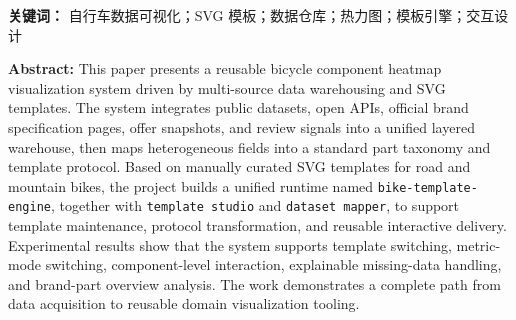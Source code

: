 \documentclass[12pt,hyperref,a4paper,UTF8]{ctexart}
\begin{document}
\cover

\begin{abstract}
针对自行车整车及配件数据来源分散、字段异构、部件语义不统一以及传统统计图难以表达结构差异的问题，本文设计并实现了一套基于可复用 SVG 模板与多源数据仓库的自行车配件热力图可视化系统。系统围绕“数据获取、统一建库、语义归一、模板设计、运行时渲染、工具化复用”六个环节展开：首先接入公开数据集、Bike Index API、品牌官网、配件目录、报价与评测来源，构建面向可视化任务的多源采集链路；其次采用 \texttt{raw--bronze--silver--gold} 分层数据仓库组织整车、部件、报价、评测、图像与标注等实体，并以标准部件 taxonomy 完成官网规格字段到模板槽位的映射；随后基于 Inkscape 手工设计公路车与山地车两套可复用 SVG 模板，建立 \texttt{partKey} 到 SVG 元素集合的一对多绑定关系；在此基础上，将原有单页展示重构为 \texttt{bike-template-engine} 统一运行时，并实现 \texttt{template studio} 与 \texttt{dataset mapper} 两个辅助工作台，使模板维护和新数据源接入从脚本级操作提升为协议级和配置级操作。实验结果表明，该系统能够稳定支持公路车与山地车模板切换、价格/质量/性价比多模式切换、部件点击联动、模板覆盖率提示以及品牌--部件矩阵展示，并在数据稀疏条件下通过显式标注的代表性回填策略维持可解释性。本文的主要贡献在于：提出了一种面向结构化对象的模板热力图可视化方法；构建了服务于该方法的统一数据协议与模板包规范；实现了从原型页面到可复用工具原型的系统化重构。该研究为后续接入图像识别、实例分割与插件化嵌入提供了稳定基础，也为《数据可视化》课程中的数据工程、视觉编码与交互设计提供了较完整的综合实践案例。
\end{abstract}

\noindent\textbf{关键词：} 自行车数据可视化；SVG 模板；数据仓库；热力图；模板引擎；交互设计

\vspace{1em}
\noindent\textbf{Abstract:} This paper presents a reusable bicycle component heatmap visualization system driven by multi-source data warehousing and SVG templates. The system integrates public datasets, open APIs, official brand specification pages, offer snapshots, and review signals into a unified layered warehouse, then maps heterogeneous fields into a standard part taxonomy and template protocol. Based on manually curated SVG templates for road and mountain bikes, the project builds a unified runtime named \texttt{bike-template-engine}, together with \texttt{template studio} and \texttt{dataset mapper}, to support template maintenance, protocol transformation, and reusable interactive delivery. Experimental results show that the system supports template switching, metric-mode switching, component-level interaction, explainable missing-data handling, and brand-part overview analysis. The work demonstrates a complete path from data acquisition to reusable domain visualization tooling.
\end{document}
